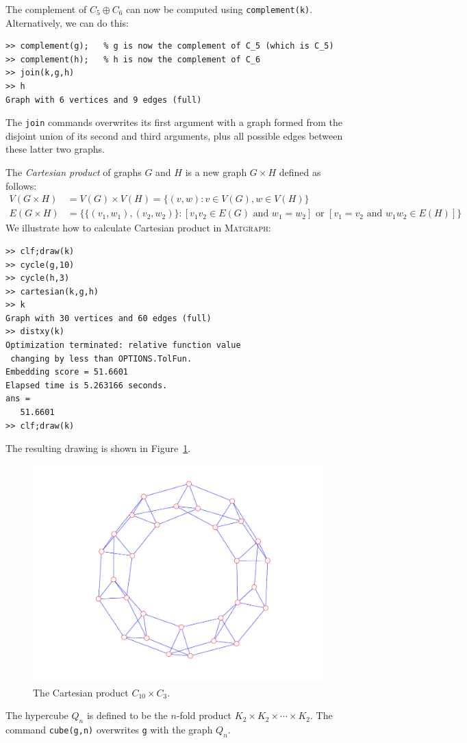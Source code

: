 \documentclass[12pt]{amsart}
\newcommand\matgraph{\textsc{Matgraph}}
\begin{document}
The complement of $C_5 \oplus C_6$ can now be computed using
\verb|complement(k)|. Alternatively, we can do this:
\begin{verbatim}
>> complement(g);   % g is now the complement of C_5 (which is C_5)
>> complement(h);   % h is now the complement of C_6
>> join(k,g,h)
>> h
Graph with 6 vertices and 9 edges (full)
\end{verbatim}
The \verb|join| commands overwrites its first argument with a graph
formed from the disjoint union of its second and third arguments, plus
all possible edges between these latter two graphs. 

The \emph{Cartesian product} of graphs $G$ and $H$ is a new graph
$G\times H$ defined as follows:
\begin{align*}
  V(G\times H) &= V(G) \times V(H) = \{(v,w): v \in V(G), w \in V(H)\}
  \\
  E(G\times H) &= \bigl\{ \{(v_1,w_1),(v_2,w_2)\} :
  [v_1v_2 \in E(G) \text{ and } w_1=w_2] \text{ or }
  [v_1=v_2 \text{ and } w_1w_2 \in E(H)] \bigr\}
\end{align*}
We illustrate how to calculate Cartesian product in \matgraph:
\begin{verbatim}
>> clf;draw(k)
>> cycle(g,10)
>> cycle(h,3)
>> cartesian(k,g,h)
>> k
Graph with 30 vertices and 60 edges (full)
>> distxy(k)
Optimization terminated: relative function value
 changing by less than OPTIONS.TolFun.
Embedding score = 51.6601
Elapsed time is 5.263166 seconds.
ans =
   51.6601
>> clf;draw(k)
\end{verbatim}
The resulting drawing is shown in Figure~\ref{fig:product-graph}.
\begin{figure}[ht]
  \begin{center}
    \includegraphics[scale=0.5]{figs/product-graph}
  \end{center}
  \caption{The Cartesian product $C_{10}\times C_3$.}
  \label{fig:product-graph}
\end{figure}
The hypercube $Q_n$ is defined to be the $n$-fold product $K_2 \times
K_2 \times \cdots \times K_2$. The command \verb|cube(g,n)| overwrites
\verb|g| with the graph $Q_n$. 
\end{document}
